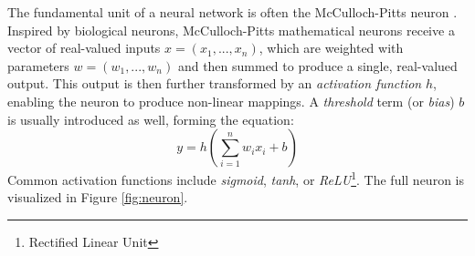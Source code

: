The fundamental unit of a neural network is often the McCulloch-Pitts neuron \cite{first-neuron}. Inspired by biological neurons, McCulloch-Pitts mathematical neurons receive a vector of real-valued inputs $x = (x_1, ..., x_n)$, which are weighted with parameters $w = (w_1, ..., w_n)$ and then summed to produce a single, real-valued output. This output is then further transformed by an \textit{activation function} $h$, enabling the neuron to produce non-linear mappings. A \textit{threshold} term (or \textit{bias}) $b$ is usually introduced as well, forming the equation:
\begin{equation*}
    y = h\left(\sum_{i=1}^n w_i x_i + b \right)
\end{equation*}
Common activation functions include \textit{sigmoid}, \textit{tanh}, or \textit{ReLU}\footnote{Rectified Linear Unit}. The full neuron is visualized in Figure \ref{fig:neuron}.
